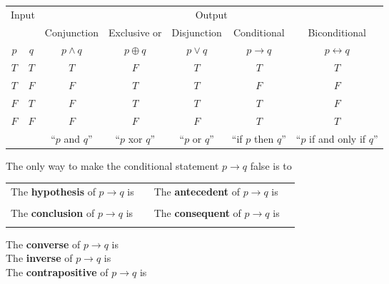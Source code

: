\documentclass[12pt, oneside]{article}
\begin{document}
\begin{center}
    \begin{tabular}{cc||c|c|c|c|c}
    \multicolumn{2}{c||}{Input}  & \multicolumn{5}{c}{Output} \\
     & & Conjunction &  Exclusive or & Disjunction  &  Conditional & Biconditional  \\
    $p$ & $q$ & $p \wedge q$ &  $p  \oplus  q$ & $p \vee  q$ & $p \to q$ & $p \leftrightarrow q$\\
    \hline
    $T$ & $T$ & $T$ & $F$ & $T$ & $T$& $T$\\
    $T$ & $F$ & $F$ & $T$ & $T$ & $F$& $F$\\
    $F$ & $T$ & $F$ & $T$ & $T$ & $T$& $F$\\
    $F$ & $F$ & $F$ & $F$ & $F$ & $T$& $T$\\
    \hline
    && ``$p$ and $q$'' & ``$p$ xor $q$'' & ``$p$ or $q$'' & ``if $p$ then $q$'' & ``$p$ if and only if $q$''
    \end{tabular}
\end{center}
     

The only way to make  the conditional statement $p \to q$ false is to \underline{\phantom{\hspace{3in}}}\\

\begin{tabular}{llll}
The {\bf  hypothesis}  of $p \to q$ is  &\underline{\phantom{\hspace{1in}}} &
The {\bf  antecedent}  of $p \to q$ is  &\underline{\phantom{\hspace{1in}}} \\
&&&  \\
The {\bf  conclusion}  of $p \to q$ is & \underline{\phantom{\hspace{1in}}}&
The {\bf  consequent}  of $p \to q$ is & \underline{\phantom{\hspace{1in}}}\\
&&&  \\
\end{tabular}
 

The {\bf converse}  of $p \to q$ is \underline{}\\

The {\bf inverse}  of $p \to q$ is \underline{}\\

The {\bf contrapositive}  of $p \to q$ is \underline{} \\
 \vfill
\end{document}
